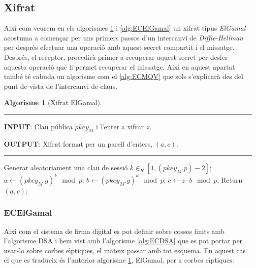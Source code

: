 \documentclass[12pt,twoside,catalan,a4paper]{book}%
\numberwithin{figure}{section}		%
\theoremstyle{definition}   			%
\def\ces{corbes e\lgem{}\'{\i}ptiques}%
\def\cfs{cossos finits}%
\theoremstyle{saltolinea}   			%
\newtheorem{algo}{Algorisme}
\begin{document}

\subsection{Xifrat}

Aix\'{\i} com veurem en els algorismes \ref{alg:ElGamal} i \ref{alg:ECElGamal} un xifrat tipus \emph{ElGamal} acostuma a comen\c{c}ar per uns primers passos d'un intercanvi de \emph{Diffie-Hellman} per despr\'es efectuar una operaci\'o amb aquest secret compartit i el missatge. Despr\'es, el receptor, procedir\`a primer a recuperar aquest secret per desfer aquesta operaci\'o que li permet recuperar el missatge. Aix\'{\i} en aquest apartat tamb\'e t\'e cabuda un algorisme com el \ref{alg:ECMQV} que sols s'explicar\`a des del punt de vista de l'intercanvi de claus.

\begin{table}[H]
\begin{algo}[Xifrat ElGamal]\label{alg:ElGamal}
\parbox[b]{\linewidth}{%
\hrule
\smallskip
{\bf INPUT}: Clau p\'ublica $pkey_{M}$ i l'enter a xifrar $z$.

{\bf OUTPUT}: Xifrat format per un parell d'enters, $(a,c)$.
\vspace{1.5mm}
\hrule
}%
\begin{algorithmic}[1]
\STATE Generar aleatoriament una clau de sessi\'o $k\in_{R}\left[1,\left(pkey_{M}.p\right)-2\right]$;
\STATE $a \leftarrow (pkey_{M}.g)^{k}\mod p$;
\STATE $b \leftarrow (pkey_{M}.y)^{k}\mod p$; 
\STATE $c \leftarrow z\cdot b\mod p$;
\STATE Return $(a,c)$;
\end{algorithmic}
\end{algo}%
\end{table}

\subsubsection{ECElGamal}

Aix\'{\i} com el sistema de firma digital es pot definir sobre \cfs{} amb l'algorisme DSA i hem vist amb l'algorisme \ref{alg:ECDSA} que es pot portar per usar-lo sobre \ces{}, el mateix passar amb tot esquema. En aquest cas el que es tradueix \'es l'anterior algorisme \ref{alg:ElGamal}, ElGamal, per a \ces{}:
\end{document}
